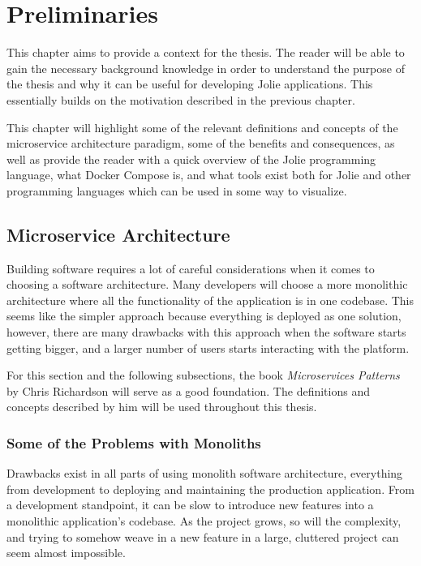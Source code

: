 \chapter{Preliminaries}
This chapter aims to provide a context for the thesis.
The reader will be able to gain the necessary background knowledge in order
to understand the purpose of the thesis and why it can be useful for developing Jolie applications. This 
essentially builds on the motivation
described in the previous chapter.

This chapter will highlight some of the relevant definitions and concepts of the microservice architecture paradigm, some of the benefits and consequences, as
 well as provide
the reader with a quick overview of the Jolie programming language,
what Docker Compose is, and what tools exist both for Jolie and
other programming languages which can be used in some way to visualize.

\section{Microservice Architecture}
Building software requires a lot of careful considerations when it comes
to choosing a software architecture. Many developers will choose a more monolithic architecture where all
 the functionality of the application
is in one codebase. This seems like the simpler approach because everything is deployed as one solution, however,
 there are many drawbacks
with this approach when the software starts getting bigger, and a larger number of users starts
interacting with the platform.

For this section and the following subsections, the book \textit{Microservices Patterns} by Chris Richardson \cite*{microservicepatterns} will serve as a good foundation. 
The definitions and concepts described by him will be used throughout this thesis.

\subsection{Some of the Problems with Monoliths}
Drawbacks exist in all parts of using monolith software architecture, everything from development to
deploying and maintaining the production application.
From a development standpoint, it can be slow to introduce new features into a monolithic application's
 codebase. As the project grows, so will the complexity, and trying to somehow weave in a new feature in a large, cluttered project can seem almost impossible.

